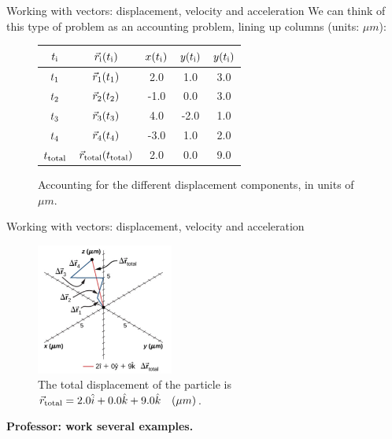 \documentclass{beamer}
\begin{document}
\begin{frame}{Working with vectors: displacement, velocity and acceleration}
We can think of this type of problem as an accounting problem, lining up columns (units: $\mu m$):
\begin{figure}
\begin{tabular}{| c | c | c | c | c |}
\hline
$t_{\rm i}$ & $\vec{r}_{\rm i}(t_{\rm i})$ & $x(t_{\rm i})$ & $y(t_{\rm i})$ & $y(t_{\rm i})$ \\
\hline
$t_{\rm 1}$ & $\vec{r}_{\rm 1}(t_{\rm 1})$ & 2.0 & 1.0 & 3.0 \\
\hline
$t_{\rm 2}$ & $\vec{r}_{\rm 2}(t_{\rm 2})$ & -1.0 & 0.0 & 3.0 \\
\hline
$t_{\rm 3}$ & $\vec{r}_{\rm 3}(t_{\rm 3})$ & 4.0 & -2.0 & 1.0 \\
\hline
$t_{\rm 4}$ & $\vec{r}_{\rm 4}(t_{\rm 4})$ & -3.0 & 1.0 & 2.0 \\
\hline
\hline
$t_{\rm total}$ & $\vec{r}_{\rm total}(t_{\rm total})$ & 2.0 & 0.0 & 9.0 \\
\hline
\end{tabular}
\caption{\label{tab:account} Accounting for the different displacement components, in units of $\mu m$.}
\end{figure}
\end{frame}

\begin{frame}{Working with vectors: displacement, velocity and acceleration}
\begin{figure}
\centering
\includegraphics[width=0.4\textwidth]{figures/Brownian.png}
\caption{\label{fig:brown2} The total displacement of the particle is $\vec{r}_{\rm total} = 2.0\hat{i} + 0.0\hat{k} + 9.0\hat{k}\quad (\mu m)$.}
\end{figure}
\textbf{Professor: work several examples.}
\end{frame}
\end{document}
